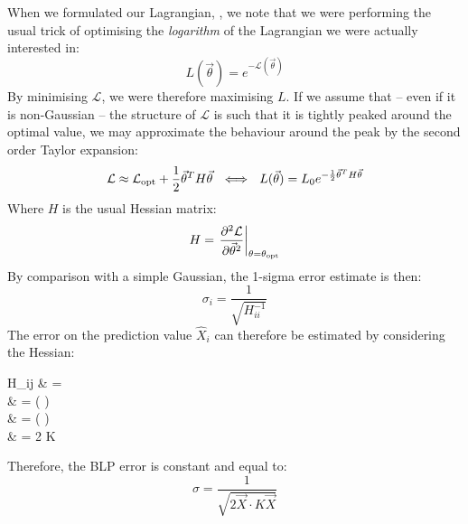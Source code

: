 \documentclass[]{article}
\def\ai{\vec{a}_{t_i}}
\begin{document}
		When we formulated our Lagrangian, , we note that we were performing the usual trick of optimising the \textit{logarithm} of the Lagrangian we were actually interested in:
		\begin{equation}
			L(\vec{\theta}) = e^{-\mathcal{L}(\vec{\theta})}
		\end{equation}
		By minimising $\mathcal{L}$, we were therefore maximising $L$. If we assume that -- even if it is non-Gaussian -- the structure of $\mathcal{L}$ is such that it is tightly peaked around the optimal value, we may approximate the behaviour around the peak by the second order Taylor expansion:
		\begin{equation}
			\mathcal{L} \approx \mathcal{L}_\text{opt} + \frac{1}{2}\vec{\theta}^T H \vec{\theta} ~~\Longleftrightarrow~~ L(\vec{\theta}) = L_0 e^{-\frac{1}{2}\vec{\theta}^T H \vec{\theta}}
		\end{equation}
		Where $H$ is the usual Hessian matrix:
		\begin{equation}
			H = \left. \frac{\partial ^2 \mathcal{L}}{\partial \vec{\theta}^2} \right|_{\theta = \theta_\text{opt}}
		\end{equation}
		By comparison with a simple Gaussian, the 1-sigma error estimate is then:
		\begin{equation}
			\sigma_i = \frac{1}{\sqrt{H^{-1}_{ii}}}
		\end{equation}
		The error on the prediction value $\hat{X}_i$ can therefore be estimated by considering the Hessian:
		\begin{spalign}
			H_{ij} & = 
			\\
			& =  \left( \pdiv{\mathcal{L}}{\ai} \cdot {}\right)
			\\
			& =   \left( \left[2 K \ai - 2 \ki \cdot \ai\right] \cdot {}\right)
			\\
			& = 2 \vec{X} \cdot K 
		\end{spalign}
		Therefore, the BLP error is constant and equal to:
		\begin{equation}
			\sigma = \frac{1}{\sqrt{2  \cdot K \vec{X}}}
		\end{equation}
\end{document}
